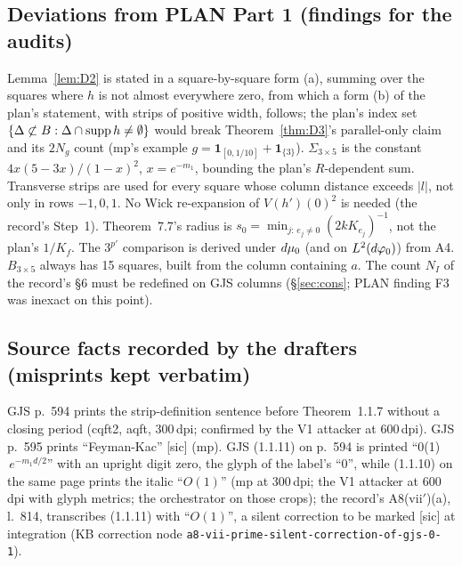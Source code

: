 \subsection*{Deviations from PLAN Part 1 (findings for the audits)}
Lemma~\ref{lem:D2} is stated in a square-by-square form (a), summing over the squares where $h$ is
not almost everywhere zero, from which a form (b) of the plan's statement, with strips of
positive width, follows; the plan's index set
$\{\Delta\not\subset B:\Delta\cap\operatorname{supp} h\neq\emptyset\}$ would break Theorem~\ref{thm:D3}'s
parallel-only claim and its $2N_g$ count (mp's example $g=\mathbf 1_{[0,1/10]}+\mathbf 1_{\{3\}}$).
$\Sigma_{3\times5}$ is the constant $4x(5-3x)/(1-x)^2$, $x=e^{-m_1}$, bounding the plan's
$R$-dependent sum. Transverse strips are used for every square whose column distance exceeds $|l|$,
not only in rows $-1,0,1$. No Wick re-expansion of $V(h')(0)^2$ is needed (the record's Step~1).
Theorem~7.7's radius is $s_0=\min_{j:\,e_j\neq0}(2kK_{e_j})^{-1}$, not the plan's $1/K_f$. The
$3^{p'}$ comparison is derived under $d\mu_0$ (and on $L^2(d\varphi_0)$) from A4. $B_{3\times5}$ always has
15 squares, built from the column containing $a$. The count $N_I$ of the record's \S6 must be
redefined on GJS columns (\S\ref{sec:cons}; PLAN finding F3 was inexact on this point).

\subsection*{Source facts recorded by the drafters (misprints kept verbatim)}
GJS p.~594 prints the strip-definition sentence before Theorem~1.1.7 without a closing period
(cqft2, aqft, 300\,dpi; confirmed by the V1 attacker at 600\,dpi). GJS p.~595 prints
``Feyman-Kac'' [sic] (mp). GJS (1.1.11) on p.~594 is printed ``0(1)$\,e^{-m_1d/2}$'' with an
upright digit zero, the glyph of the label's ``0'', while (1.1.10) on the same page prints the
italic ``$O(1)$'' (mp at 300\,dpi; the V1 attacker at 600\,dpi with glyph metrics; the
orchestrator on those crops); the record's A8(vii$'$)(a), l.~814, transcribes (1.1.11) with
``$O(1)$'', a silent correction to be marked [sic] at integration (KB correction node
\texttt{a8-vii-prime-silent-correction-of-gjs-0-1}).

